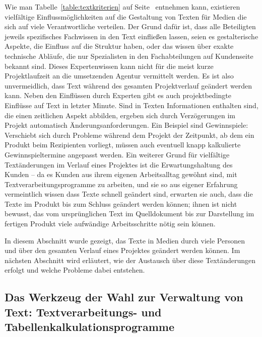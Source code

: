 Wie man Tabelle~\ref{table:textkriterien} auf Seite~\pageref{table:textkriterien} entnehmen kann, existieren vielfältige Einflussmöglichkeiten auf die Gestaltung von Texten für Medien die sich auf viele Verantwortliche verteilen. Der Grund dafür ist, dass alle Beteiligten jeweils spezifisches Fachwissen in den Text einfließen lassen, seien es gestalterische Aspekte, die Einfluss auf die Struktur haben, oder das wissen über exakte technische Abläufe, die nur Spezialisten in den Fachabteilungen auf Kundenseite bekannt sind. Dieses Expertenwissen kann nicht für die meist kurze Projektlaufzeit an die umsetzenden Agentur vermittelt werden. Es ist also unvermeidlich, dass Text während des gesamten Projektverlauf geändert werden kann. Neben den Einflüssen durch Experten gibt es auch projektbedingte Einflüsse auf Text in letzter Minute. Sind in Texten Informationen enthalten sind, die einen zeitlichen Aspekt abbilden, ergeben sich durch Verzögerungen im Projekt automatisch Änderungsanforderungen. Ein Beispiel sind Gewinnspiele: Verschiebt sich durch Probleme während dem Projekt der Zeitpunkt, ab dem ein Produkt beim Rezipienten vorliegt, müssen auch eventuell knapp kalkulierte Gewinnspieltermine angepasst werden. Ein weiterer Grund für vielfältige Textänderungen im Verlauf eines Projektes ist die Erwartungshaltung des Kunden -- da es Kunden aus ihrem eigenen Arbeitsalltag gewöhnt sind, mit Textverarbeitungsprogramme zu arbeiten, und sie so aus eigener Erfahrung vermeintlich wissen dass Texte schnell geändert sind, erwarten sie auch, dass die Texte im Produkt bis zum Schluss geändert werden können; ihnen ist nicht bewusst, das vom ursprünglichen Text im Quelldokument bis zur Darstellung im fertigen Produkt viele aufwändige Arbeitsschritte nötig sein können.

\bigskip

In diesem Abschnitt wurde gezeigt, das Texte in Medien durch viele Personen und über den gesamten Verlauf eines Projektes geändert werden können. Im nächsten Abschnitt wird erläutert, wie der Austausch über diese Textänderungen erfolgt und welche Probleme dabei entstehen.

\subsection{Das Werkzeug der Wahl zur Verwaltung von Text: Textverarbeitungs- und Tabellenkalkulationsprogramme}

